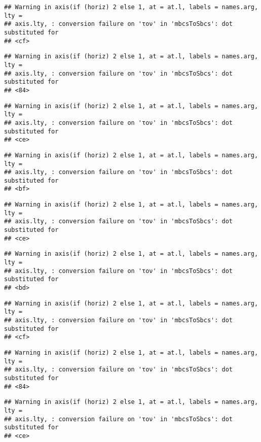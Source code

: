 \documentclass[
]{article}
\begin{document}
\begin{verbatim}
## Warning in axis(if (horiz) 2 else 1, at = at.l, labels = names.arg, lty =
## axis.lty, : conversion failure on 'τον' in 'mbcsToSbcs': dot substituted for
## <cf>
\end{verbatim}

\begin{verbatim}
## Warning in axis(if (horiz) 2 else 1, at = at.l, labels = names.arg, lty =
## axis.lty, : conversion failure on 'τον' in 'mbcsToSbcs': dot substituted for
## <84>
\end{verbatim}

\begin{verbatim}
## Warning in axis(if (horiz) 2 else 1, at = at.l, labels = names.arg, lty =
## axis.lty, : conversion failure on 'τον' in 'mbcsToSbcs': dot substituted for
## <ce>
\end{verbatim}

\begin{verbatim}
## Warning in axis(if (horiz) 2 else 1, at = at.l, labels = names.arg, lty =
## axis.lty, : conversion failure on 'τον' in 'mbcsToSbcs': dot substituted for
## <bf>
\end{verbatim}

\begin{verbatim}
## Warning in axis(if (horiz) 2 else 1, at = at.l, labels = names.arg, lty =
## axis.lty, : conversion failure on 'τον' in 'mbcsToSbcs': dot substituted for
## <ce>
\end{verbatim}

\begin{verbatim}
## Warning in axis(if (horiz) 2 else 1, at = at.l, labels = names.arg, lty =
## axis.lty, : conversion failure on 'τον' in 'mbcsToSbcs': dot substituted for
## <bd>
\end{verbatim}

\begin{verbatim}
## Warning in axis(if (horiz) 2 else 1, at = at.l, labels = names.arg, lty =
## axis.lty, : conversion failure on 'τον' in 'mbcsToSbcs': dot substituted for
## <cf>
\end{verbatim}

\begin{verbatim}
## Warning in axis(if (horiz) 2 else 1, at = at.l, labels = names.arg, lty =
## axis.lty, : conversion failure on 'τον' in 'mbcsToSbcs': dot substituted for
## <84>
\end{verbatim}

\begin{verbatim}
## Warning in axis(if (horiz) 2 else 1, at = at.l, labels = names.arg, lty =
## axis.lty, : conversion failure on 'τον' in 'mbcsToSbcs': dot substituted for
## <ce>
\end{verbatim}
\end{document}
